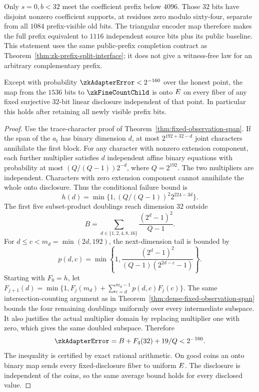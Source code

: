 Only $s=0,b<32$ meet the coefficient prefix below $4096$. Those $32$ bits have disjoint nonzero coefficient supports, at residues zero modulo sixty-four, separate from all $1084$ prefix-visible old bits. The triangular encoder map therefore makes the full prefix equivalent to $1116$ independent source bits plus its public baseline. This statement uses the same public-prefix completion contract as Theorem~\ref{thm:zk-prefix-split-interface}; it does not give a witness-free law for an arbitrary complementary prefix.

\begin{lemma}\label{lem:zk-count-adapter-span}
Except with probability $\zkAdapterError<2^{-160}$ over the honest point, the map from the $1536$ bits to $\zkFineCountChild$ is onto $E$ on every fiber of any fixed surjective $32$-bit linear disclosure independent of that point. In particular this holds after retaining all newly visible prefix bits.
\end{lemma}
\begin{proof}
Use the trace-character proof of Theorem~\ref{thm:fixed-observation-span}. If the span of the $a_t$ has binary dimension $d$, at most $2^{192+32-d}$ joint characters annihilate the first block. For any character with nonzero extension component, each further multiplier satisfies $d$ independent affine binary equations with probability at most $(Q/(Q-1))2^{-d}$, where $Q=2^{192}$. The two multipliers are independent. Characters with zero extension component cannot annihilate the whole onto disclosure. Thus the conditional failure bound is
\[
 h(d)=\min\{1,(Q/(Q-1))^2 2^{224-3d}\}.
\]
The first five subset-product doublings reach dimension $32$ outside
\[
 B=\sum_{d\in\{1,2,4,8,16\}}\frac{(2^d-1)^2}{Q-1}.
\]
For $d\le c<m_d=\min(2d,192)$, the next-dimension tail is bounded by
\[
 p(d,c)=\min\left\{1,\frac{(2^d-1)^2}{(Q-1)(2^{2d-c}-1)}\right\}.
\]
Starting with $F_0=h$, let $F_{j+1}(d)=\min\{1,F_j(m_d)+\sum_{c=d}^{m_d-1}p(d,c)F_j(c)\}$. The same intersection-counting argument as in Theorem~\ref{thm:dense-fixed-observation-span} bounds the four remaining doublings uniformly over every intermediate subspace. It also justifies the actual multiplier domain by replacing multiplier one with zero, which gives the same doubled subspace. Therefore
\[
 \zkAdapterError=B+F_4(32)+19/Q<2^{-160}.
\]
The inequality is certified by exact rational arithmetic. On good coins an onto binary map sends every fixed-disclosure fiber to uniform $E$. The disclosure is independent of the coins, so the same average bound holds for every disclosed value.
\end{proof}


